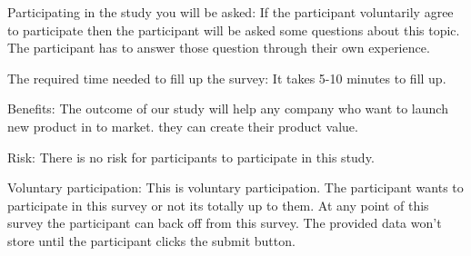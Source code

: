 \documentclass[conference]{IEEEtran}
\begin{document}
Participating in the study you will be asked: If the participant voluntarily agree to participate then the participant will be asked some questions about this topic. The participant has to answer those question through their own experience.

The required time needed to fill up the survey: It takes 5-10 minutes to fill up.

Benefits: The outcome of our study will help any company who want to launch new product in to market. they can create their product value.

Risk: There is no risk for participants to participate in this study.
 
Voluntary participation:
This is voluntary participation. The participant wants to participate in this survey or not its totally up to them. At any point of this survey the participant can back off from this survey. The provided data won’t store until the participant clicks the submit button. 


%

\end{document}
